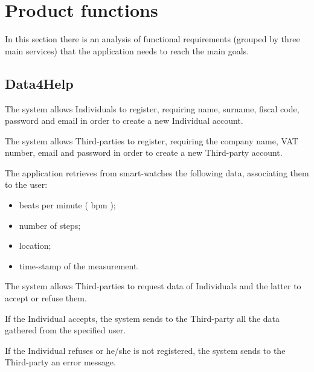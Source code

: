 \section{Product functions}

In this section there is an analysis of functional requirements (grouped by three main services) that the application needs to reach the main goals. 



\subsection{Data4Help}
\begin{enumerate}[label={[}R1.\arabic*{]}, leftmargin=*]

    \item \label{R1-Individual-registration} The system allows Individuals to register, requiring name, surname, fiscal code, password and email in order to create a new Individual account.

    \item \label{R1-third-party-registration} The system allows Third-parties to register, requiring the company name, VAT number, email and password in order to create a new Third-party account.
    
    \item \label{R1-gathered-data} The application retrieves from smart-watches the following data, associating them to the user: 
    \begin{itemize}
        \item beats per minute ( bpm );
        \item number of steps;
        \item location;
        \item time-stamp of the measurement.
    \end{itemize}
    
    \item \label{R1-individual-request} The system allows Third-parties to request data of Individuals and the latter to accept or refuse them. 
    \begin{enumerate}[label={[}R1.\arabic{enumi}.\arabic*{]}, leftmargin=*]
        \item \label{R1-individual-accept-request} If the Individual accepts, the system sends to the Third-party all the data gathered from the specified user.
    
        \item \label{R1-individual-refused-request} If the Individual refuses or he/she is not registered, the system sends to the Third-party an error message.
    \end{enumerate}
    

\end{enumerate}
